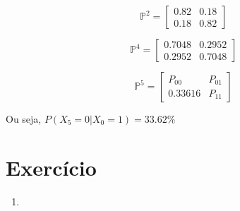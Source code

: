\documentclass{article}
\begin{document}
\begin{enumerate}[label=(\alph*)]
    $$\mathbb{P}^2=\begin{bmatrix}
        0.82 & 0.18\\
        0.18 & 0.82
    \end{bmatrix}$$
    
    $$\mathbb{P}^4=\begin{bmatrix}
        0.7048 & 0.2952\\
        0.2952 & 0.7048
    \end{bmatrix}$$
    
    $$\mathbb{P}^5=\begin{bmatrix}
        P_{00} & P_{01}\\
        0.33616 & P_{11}
    \end{bmatrix}$$
    
    Ou seja, $P(X_5=0|X_0=1) = 33.62\%$

\end{enumerate}

\section{Exercício}

\begin{enumerate}[label=(\alph*)]
    \item 

\end{enumerate}
\end{document}
